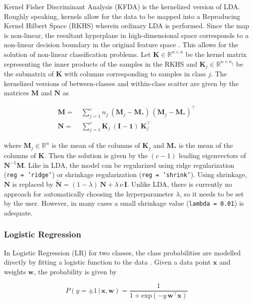 \documentclass[utf8]{frontiersSCNS} %
\newcommand{\w}{\mathbf{w}}
\newcommand{\x}{\mathbf{x}}
\newcommand{\I}{\mathbf{I}}
\newcommand{\K}{\mathbf{K}}
\newcommand{\M}{\mathbf{M}}
\newcommand{\R}{\mathbb{R}}
\newcommand{\ttt}[1]{\texttt{#1}}
\begin{document}
Kernel Fisher Discriminant Analysis (KFDA) is the kernelized version of LDA. Roughly speaking, kernels allow for the data to be mapped into a Reproducing Kernel Hilbert Space (RKHS) wherein ordinary LDA is performed. Since the map is non-linear, the resultant hyperplane in high-dimensional space corresponds to a non-linear decision boundary in the original feature space \citep{Mika1999FisherKernels}. This allows for the solution of non-linear classification problems. Let $\K\in\R^{n\times n}$ be the kernel matrix representing the inner products of the samples in the RKHS and $\K_j\in\R^{n \times n_j}$ be the submatrix of $\K$ with columns corresponding to samples in class $j$. The kernelized versions of between-classes and within-class scatter are given by the matrices $\M$ and $\mathbf{N}$ as


\begin{equation}
\label{eq:kernelFDA}
\begin{alignedat}{2}
\M =\ &  \sum_{j=1}^c n_j\ (\M_j - \M_*)\,(\M_j-\M_*)^\top\\
\mathbf{N} =\ & \sum_{j=1}^c \K_j\ (\mathbf{I} - \mathbf{1})\  \K_j^\top
\end{alignedat}
\end{equation}

where $\M_j\in\R^n$ is the mean of the columns of $\K_j$ and $\M_*$ is the mean of the columns of $\K$. Then the solution is given by the $(c-1)$ leading eigenvectors of $\mathbf{N}^{-1} \mathbf{M}$. 
Like in LDA, the model can be regularized using ridge regularization (\ttt{reg = 'ridge'}) or shrinkage regularization (\ttt{reg = 'shrink'}). Using shrinkage, $\mathbf{N}$ is replaced by $\widetilde{\mathbf{N}} = (1-\lambda)\ \mathbf{N} + \lambda\,\nu\,\I$. Unlike LDA, there is currently no approach for automatically choosing the hyperparameter $\lambda$, so it needs to be set by the user. However, in many cases a small shrinkage value (\ttt{lambda = 0.01}) is adequate.

\subsubsection{Logistic Regression}

In Logistic Regression (LR) for two classes, the class probabilities are modelled directly by fitting a logistic function to the data \citep{Hastie2009}. Given a data point $\x$ and weights $\w$, the probability is given by

\begin{equation}
\label{eq:logreg_probability}
P(y = \pm 1\,|\,\x,\w) = \frac{1}{1 + \text{exp}(-y\,\w^\top\x)}
\end{equation}
\end{document}
